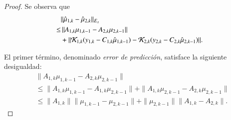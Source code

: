 \begin{proof}
Se observa que  
\begin{equation*}
	\begin{aligned}
		&	\| \hat \mu_{1,k} - \hat \mu_{2,k} \|_{E_x}  \\
		\leq & \, \| A_{1,k} \mu_{1,k-1}  - A_{2,k} \mu_{2,k-1} \|  \\
		& + \|  \mathcal{K}_{1,k} (y_{1,k} - C_{1,k} \hat\mu_{1,k-1}) -  \mathcal{K}_{2,k} (y_{2,k} - C_{2,k} \hat\mu_{2,k-1})  \|.
	\end{aligned}
\end{equation*}

El primer término, denominado \textit{error de predicción}, satisface la siguiente desigualdad:
\begin{equation*}
	\begin{aligned}
		& \| A_{1,k} \mu_{1,k-1}  - A_{2,k} \mu_{2,k-1} \|  \\
		& \leq \| A_{1,k} \mu_{1,k-1}  - A_{1,k} \mu_{2,k-1} \| + \| A_{1,k} \mu_{2,k-1}  - A_{2,k} \mu_{2,k-1} \| \\
		& \leq \| A_{1,k} \| \| \mu_{1,k-1}  - \mu_{2,k-1} \| +  \| \mu_{2,k-1} \| \| A_{1,k} - A_{2,k} \|.
	\end{aligned}
\end{equation*}


\end{proof}
